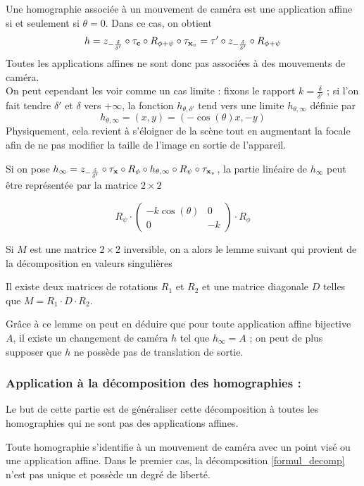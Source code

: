 \begin{Remaffin}
Une homographie associée à un mouvement de caméra est une application affine si et seulement si $\theta=0$. Dans ce cas, on obtient  
\begin{equation*}
h=z_{-\frac{\delta}{\delta'}} \circ \tau_{\mathbf{c}} \circ R_{\phi+\psi} \circ \tau_{\mathbf{x}_{v}}
=\tau' \circ z_{-\frac{\delta}{\delta'}} \circ  R_{\phi+\psi}
\end{equation*}
Toutes les applications affines ne sont donc pas associées à des mouvements de caméra.\\
On peut cependant les voir comme un cas limite : fixons le rapport  $k=\frac{\delta}{\delta'}$ ; si l'on fait tendre $\delta'$ et $\delta$ vers $+\infty$, la fonction $h_{\theta,\delta'}$ tend vers une limite $h_{\theta,\infty}$ définie par
\begin{equation*}
h_{\theta,\infty}=(x,y)=(-\cos(\theta)x,-y)
\end{equation*}
Physiquement, cela revient à s'éloigner de la scène tout en augmentant la focale afin de ne pas modifier la taille de l'image en sortie de l'appareil.

Si on pose $h_\infty = z_{-\frac{\delta}{\delta'}} \circ \tau_{\mathbf{x}} \circ R_{\phi} \circ h_{\theta,\infty} \circ R_{\psi} \circ \tau_{\mathbf{x}_{v}}$, la partie linéaire de $h_{\infty}$ peut être représentée par la matrice $2\times2$

\begin{equation*}
R_{\psi} \cdot 
\begin{pmatrix}
-k\cos(\theta)&0\\
0&-k
\end{pmatrix}
\cdot R_{\phi}
\end{equation*}

Si  $M$ est une matrice $2\times 2$ inversible, on a alors le lemme suivant qui provient de la décomposition en valeurs singulières \cite{morel2009asift}
\begin{lem}
Il existe deux matrices de rotations $R_1$ et $R_2$  et une matrice diagonale $D$ telles que $M = R_1 \cdot D \cdot R_2$.
\end{lem}
Grâce à ce lemme on peut en déduire que pour toute application affine bijective $A$, il existe un changement de caméra $h$ tel que $h_\infty = A$ ; on peut de plus supposer que $h$ ne possède pas de translation de sortie.
\end{Remaffin}


\subsubsection{Application à la décomposition des homographies :}
Le but de cette partie est de généraliser cette décomposition à toutes les homographies qui ne sont pas des applications affines.
\begin{prop}
Toute homographie s'identifie à un mouvement de caméra avec un point visé ou une application affine. Dans le premier cas, la décomposition \ref{formul_decomp} n'est pas unique et possède un degré de liberté.
\label{thepropdecomp}
\end{prop}
